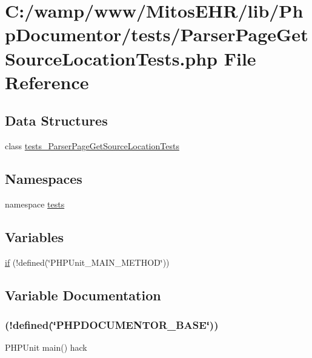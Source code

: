 \hypertarget{_parser_page_get_source_location_tests_8php}{\section{\-C\-:/wamp/www/\-Mitos\-E\-H\-R/lib/\-Php\-Documentor/tests/\-Parser\-Page\-Get\-Source\-Location\-Tests.php \-File \-Reference}
\label{_parser_page_get_source_location_tests_8php}
}
\subsection*{\-Data \-Structures}
\begin{DoxyCompactItemize}
\item 
class \hyperlink{classtests___parser_page_get_source_location_tests}{tests\-\_\-\-Parser\-Page\-Get\-Source\-Location\-Tests}
\end{DoxyCompactItemize}
\subsection*{\-Namespaces}
\begin{DoxyCompactItemize}
\item 
namespace \hyperlink{namespacetests}{tests}
\end{DoxyCompactItemize}
\subsection*{\-Variables}
\begin{DoxyCompactItemize}
\item 
\hyperlink{_parser_page_get_source_location_tests_8php_ae3cacee49c3c7d622bb92397daeb7733}{if} (!defined(\char`\"{}\-P\-H\-P\-Unit\-\_\-\-M\-A\-I\-N\-\_\-\-M\-E\-T\-H\-O\-D\char`\"{}))
\end{DoxyCompactItemize}


\subsection{\-Variable \-Documentation}
\hypertarget{_parser_page_get_source_location_tests_8php_ae3cacee49c3c7d622bb92397daeb7733}{
\subsubsection[{if}]{(!defined(\char`\"{}\-P\-H\-P\-D\-O\-C\-U\-M\-E\-N\-T\-O\-R\-\_\-\-B\-A\-S\-E\char`\"{}))}}\label{_parser_page_get_source_location_tests_8php_ae3cacee49c3c7d622bb92397daeb7733}
\-P\-H\-P\-Unit main() hack

